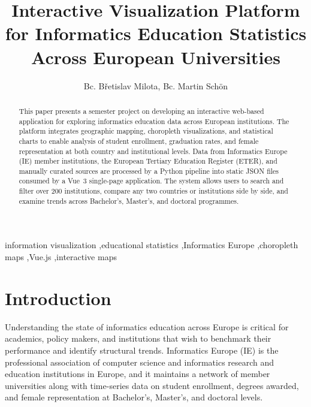 \documentclass[final,3p,times,twocolumn]{elsarticle}
\begin{document}
\begin{frontmatter}

\title{Interactive Visualization Platform for Informatics Education Statistics Across European Universities}

\author{Bc. Břetislav Milota, Bc. Martin Schön}

\address{Department of Computer Science and Engineering, Faculty of Applied Sciences, University of West Bohemia, Plze\v{n}, Czech Republic}

\begin{abstract}
This paper presents a semester project on developing an interactive web-based application for exploring informatics education data across European institutions. The platform integrates geographic mapping, choropleth visualizations, and statistical charts to enable analysis of student enrollment, graduation rates, and female representation at both country and institutional levels. 
Data from Informatics Europe (IE) member institutions, the European Tertiary Education Register (ETER), and manually curated sources are processed by a Python pipeline into static JSON files consumed by a Vue~3 single-page application. The system allows users to search and filter over 200 institutions, compare any two countries or institutions side by side, and examine trends across Bachelor's, Master's, and doctoral programmes.
\end{abstract}

\begin{keyword}
information visualization \sep educational statistics \sep Informatics Europe \sep choropleth maps \sep Vue.js \sep interactive maps
\end{keyword}

\end{frontmatter}


\section{Introduction}

Understanding the state of informatics education across Europe is critical for academics, policy makers, and institutions that wish to benchmark their performance and identify structural trends. Informatics Europe (IE) is the professional association of computer science and informatics research and education institutions in Europe, and it maintains a network of member universities along with time-series data on student enrollment, degrees awarded, and female representation at Bachelor's, Master's, and doctoral levels.
\end{document}
